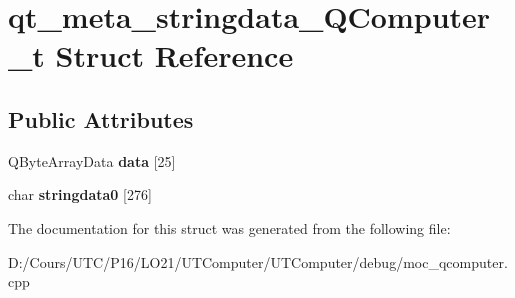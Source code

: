 \hypertarget{structqt__meta__stringdata___q_computer__t}{}\section{qt\+\_\+meta\+\_\+stringdata\+\_\+\+Q\+Computer\+\_\+t Struct Reference}
\label{structqt__meta__stringdata___q_computer__t}
\subsection*{Public Attributes}
\begin{DoxyCompactItemize}
\item 
Q\+Byte\+Array\+Data {\bfseries data} \mbox{[}25\mbox{]}\hypertarget{structqt__meta__stringdata___q_computer__t_a0359151e670e5c6307f2dc328ec5705d}{}\label{structqt__meta__stringdata___q_computer__t_a0359151e670e5c6307f2dc328ec5705d}

\item 
char {\bfseries stringdata0} \mbox{[}276\mbox{]}\hypertarget{structqt__meta__stringdata___q_computer__t_aae45e69392ee276ec54955cec0569d8b}{}\label{structqt__meta__stringdata___q_computer__t_aae45e69392ee276ec54955cec0569d8b}

\end{DoxyCompactItemize}


The documentation for this struct was generated from the following file\+:\begin{DoxyCompactItemize}
\item 
D\+:/\+Cours/\+U\+T\+C/\+P16/\+L\+O21/\+U\+T\+Computer/\+U\+T\+Computer/debug/moc\+\_\+qcomputer.\+cpp\end{DoxyCompactItemize}
